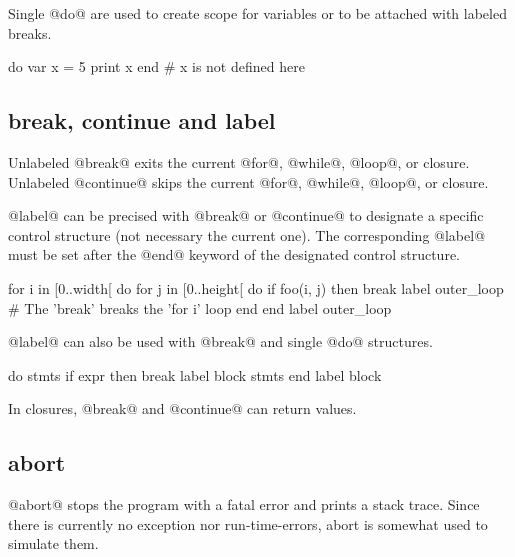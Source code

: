 Single @do@ are used to create scope for variables or to be attached with labeled breaks.

\begin{lst}
do
	var x = 5
	print x
end
# x is not defined here
\end{lst}

\subsection{break, continue and label}\label{break}\label{continue}\label{label}

Unlabeled @break@ exits the current @for@, @while@, @loop@, or closure.
Unlabeled @continue@ skips the current @for@, @while@, @loop@, or closure.

@label@ can be precised with @break@ or @continue@ to designate a specific control structure (not necessary the current one). 
The corresponding @label@ must be set after the @end@ keyword of the designated control structure.

\begin{lst}
for i in [0..width[ do
	for j in [0..height[ do
		if foo(i, j) then break label outer_loop
		# The 'break' breaks the 'for i' loop
	end
end label outer_loop
\end{lst}

@label@ can also be used with @break@ and single @do@ structures.

\begin{lst}
do
	stmts
	if expr then break label block
	stmts
end label block
\end{lst}

In closures, @break@ and @continue@ can return values.

\subsection{abort}\label{abort}

@abort@ stops the program with a fatal error and prints a stack trace.
Since there is currently no exception nor run-time-errors, abort is somewhat used to simulate them.

